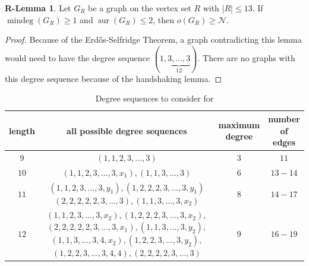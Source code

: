 \documentclass[a4paper,11pt,oneside]{scrartcl}
\theoremstyle{definition}
\newtheorem{r-lemma}{R-Lemma}
\theoremstyle{remark}
\DeclareMathOperator{\mindeg}{mindeg}
\DeclareMathOperator{\sur}{sur}
\begin{document}
\begin{r-lemma}\label{r-lemma:R_13_i=s+2}
    Let $G_{R}$ be a graph on the vertex set $R$ with $|R| \leq 13$. If $\mindeg(G_R) \geq 1$ and $\sur(G_R) \leq 2$, then $o(G_R) \geq \mathcal N$.
\end{r-lemma}
\begin{proof}
    Because of the Erd\H{o}s-Selfridge Theorem, a graph contradicting this lemma would need to have the degree sequence $(1,\underbrace{3,\dots,3}_{12})$. There are no graphs with this degree sequence because of the handshaking lemma.
\end{proof}

\begin{table}[!ht]
    \centering
    \begin{tabular}{c  c  c  c}
        \toprule
        length & all possible degree sequences & \makecell{maximum\\degree} & \makecell{number\\of edges}\\
        \midrule
        $9$ & $(1,1,2,3,\dots,3)$ & $3$ & $11$ \\ 
        $10$ & $(1,1,2,3,\dots,3,x_1), (1,1,3,\dots,3)$ & $6$ & $13 - 14$ \\
        $11$ & \makecell{$(1,1,2,3,\dots,3,y_1),(1,2,2,2,3,\dots,3,y_1)$\\
        $(2,2,2,2,2,3,\dots,3),(1,1,3,\dots,3,x_2)$} & $8$ & $14-17$ \\ 
        $12$ & \makecell{$(1,1,2,3,\dots,3,x_2), (1,2,2,2,3,\dots,3,x_2),$ \\
        $(2,2,2,2,2,3,\dots,3,x_1),(1,1,3,\dots,3,y_2),$\\
        $(1,1,3,\dots,3,4,x_2),(1,2,2,3,\dots,3,y_2),$\\
        $(1,2,2,3,\dots,3,4,4),(2,2,2,2,3,\dots,3)$} & $9$ & $16-19$ \\
        \bottomrule
    \end{tabular}
    \caption{Degree sequences to consider for }\label{table:R_12}
\end{table}
\end{document}
